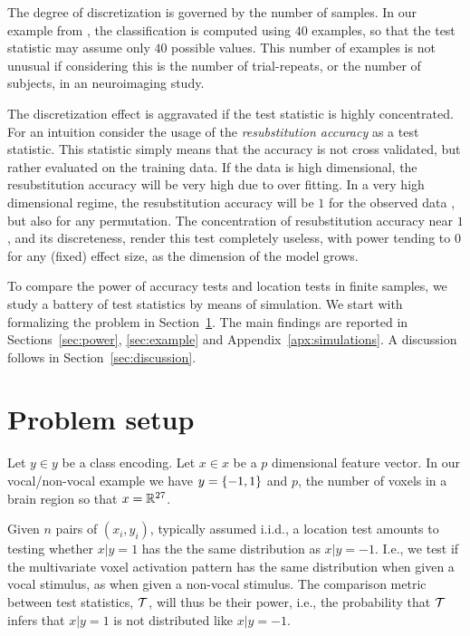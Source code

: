 \documentclass[12pt,a4paper]{article}
\begin{document}
The degree of discretization is governed by the number of samples. 
In our example from \citet{gilron_quantifying_2016}, the classification is computed using $40$ examples, so that the test statistic may assume only $40$ possible values. 
This number of examples is not unusual if considering this is the number of trial-repeats, or the number of subjects, in an neuroimaging study. 

The discretization effect is aggravated if the test statistic is highly concentrated. 
For an intuition consider the usage of the \emph{resubstitution accuracy} as a test statistic. 
This statistic simply means that the accuracy is not cross validated, but rather evaluated on the training data.
If the data is high dimensional, the resubstitution accuracy will be very high due to over fitting. 
In a very high dimensional regime, the resubstitution accuracy will be $1$ for the observed data \cite[Theorem 1]{mclachlan_bias_1976}, but also for any permutation.
The concentration of resubstitution accuracy near $1$, and its discreteness, render this test completely useless, with power tending to $0$ for any (fixed) effect size, as the dimension of the model grows. 


To compare the power of accuracy tests and location tests in finite samples, we study a battery of test statistics by means of simulation. 
We start with formalizing the problem in Section~\ref{sec:problem_setup}.
The main findings are reported in Sections~\ref{sec:power}, \ref{sec:example} and Appendix~\ref{apx:simulations}.
A discussion follows in Section~\ref{sec:discussion}. 



\section{Problem setup}
\label{sec:problem_setup}

Let $y \in y$ be a class encoding. 
Let $x \in x$ be a $p$ dimensional feature vector. 
In our vocal/non-vocal example we have $y=\{ -1,1 \}$ and $p$, the number of voxels in a brain region so that $x=\mathbb{R}^{27}$. 

Given $n$ pairs of $(x_i,y_i)$, typically assumed i.i.d., a location test amounts to testing whether $x|y=1$ has the the same distribution as $x|y=-1$. 
I.e., we test if the multivariate voxel activation pattern has the same distribution when given a vocal stimulus, as when given a non-vocal stimulus. 
The comparison metric between test statistics, $\mathcal{T}$, will thus be their power, i.e., the probability that $\mathcal{T}$ infers that $x|y=1$ is not distributed like $x|y=-1$.
\end{document}
